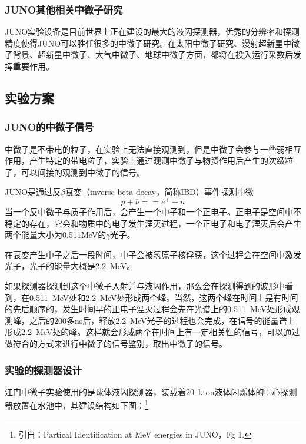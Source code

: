 \documentclass[15pt,a4paper]{article}
\begin{document}
\subsubsection{JUNO其他相关中微子研究}

JUNO实验设备是目前世界上正在建设的最大的液闪探测器，优秀的分辨率和探测精度使得JUNO可以胜任很多的中微子研究。在太阳中微子研究、漫射超新星中微子背景、超新星中微子、大气中微子、地球中微子方面，都将在投入运行采数后发挥重要作用。

\subsection{实验方案}\label{sub:logicinter}

\subsubsection{JUNO的中微子信号}\label{sub:logicinter}

中微子是不带电的粒子，在实验上无法直接观测到，但是中微子会参与一些弱相互作用，产生特定的带电粒子，实验上通过观测中微子与物资作用后产生的次级粒子，可以间接的观测到中微子的信号。

JUNO是通过反$\beta$衰变（inverse beta decay，简称IBD）事件探测中微$$p+\bar{\nu}==e^{+}+n$$
当一个反中微子与质子作用后，会产生一个中子和一个正电子。正电子是空间中不稳定的存在，它会和物质中的电子发生湮灭过程，一个正电子和电子湮灭后会产生两个能量大小为0.511MeV的$\gamma$光子。

在衰变产生中子之后一段时间，中子会被氢原子核俘获，这个过程会在空间中激发光子，光子的能量大概是\SI{2.2}{MeV}。

如果探测器探测到这个中微子入射并与液闪作用，那么会在探测得到的波形中看到，在\SI{0.511}{MeV}处和\SI{2.2}{MeV}处形成两个峰。当然，这两个峰在时间上是有时间的先后顺序的，发生时间早的正电子湮灭过程会先在光谱上的\SI{0.511}{MeV}处形成观测峰，之后的200多ns后，释放\SI{2.2}{MeV}光子的过程也会完成，在信号的能量谱上形成\SI{2.2}{MeV}处的峰。这样就会形成两个在时间上有一定相关性的信号，可以通过做符合的方式来进行中微子的信号鉴别，取出中微子的信号。

\subsubsection{实验的探测器设计}\label{sub:logicinter}

江门中微子实验使用的是球体液闪探测器，装载着\SI{20}{kton}液体闪烁体的中心探测器放置在水池中，其建设结构如下图：\footnote{引自：Partical Identification at MeV energies in JUNO，Fg 1.}
\end{document}
